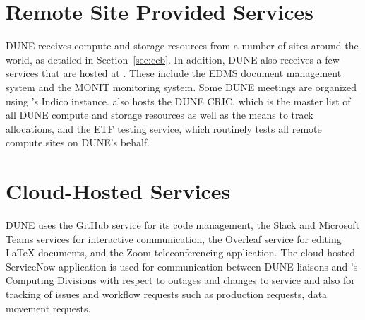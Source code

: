 \documentclass[../main-v1.tex]{subfiles}
\begin{document}

\section{Remote Site Provided Services}
DUNE receives compute and storage resources from a number of sites around the world, as detailed in %
Section~\ref{sec:ccb}. In addition, DUNE also receives a few services that are hosted at .  These include the EDMS document
management system and the MONIT monitoring system. Some DUNE meetings are organized using 's Indico instance.   also hosts the DUNE CRIC, which is the master list of all DUNE compute and storage resources as well as the means to track allocations, and the ETF testing service, which routinely tests all remote compute sites on DUNE's behalf. %


\section{Cloud-Hosted Services}
DUNE uses the GitHub service for its code management, the Slack and Microsoft Teams services for interactive communication, the Overleaf service for editing \LaTeX{} documents, and the Zoom teleconferencing application.  The cloud-hosted ServiceNow application is used for communication between DUNE liaisons and %
's Computing Divisions with respect to outages and changes to service and also for %
tracking of issues and workflow requests such as production requests, data movement requests.
\end{document}
